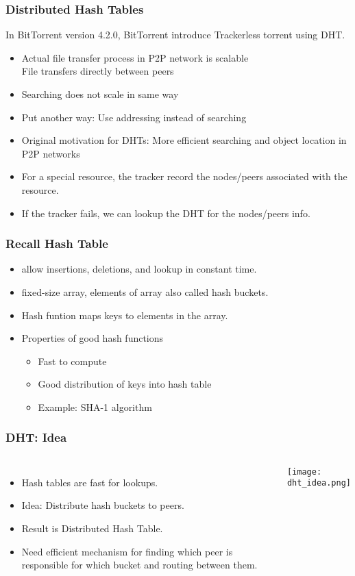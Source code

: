 \begin{frame}
    \frametitle{Distributed Hash Tables}
    In BitTorrent version 4.2.0, BitTorrent introduce \alert{Trackerless} torrent using DHT.
    \begin{itemize}
        \item Actual file transfer process in P2P network is scalable \\
            File transfers directly between peers
        \item Searching does not scale in same way
        \item Put another way: Use addressing instead of searching
        \item Original motivation for DHTs: \alert{More efficient searching and object location in P2P networks}
        \item For a special resource, the tracker record the nodes/peers associated with the resource.
        \item If the tracker fails, we can \alert{lookup} the DHT for the nodes/peers info.
    \end{itemize}
\end{frame}

\begin{frame}
    \frametitle{Recall Hash Table}
    \begin{itemize}
        \item allow insertions, deletions, and lookup in constant time.
        \item fixed-size array, elements of array also called \alert{hash buckets}.
        \item Hash funtion maps keys to elements in the array.
        \item Properties of good hash functions
        \begin{itemize}
            \item Fast to compute
            \item Good distribution of keys into hash table
            \item Example: SHA-1 algorithm
        \end{itemize}
    \end{itemize}
\end{frame}

\begin{frame}
    \frametitle{DHT: Idea}
    \begin{columns}
        \begin{itemize}
            \item Hash tables are fast for lookups.
            \item Idea: Distribute hash buckets to peers.
            \item Result is \alert{Distributed Hash Table}.
            \item Need efficient mechanism for finding which peer is responsible for which bucket and routing between them.
        \end{itemize}
            \texttt{[image: dht\_idea.png]}
    \end{columns}
\end{frame}

